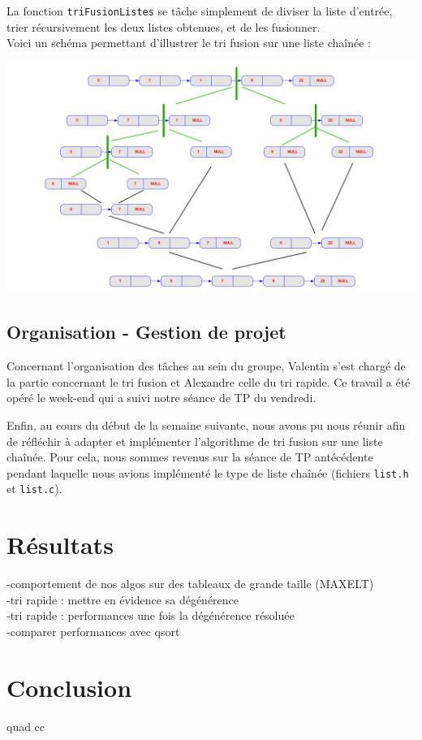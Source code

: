 \documentclass[11pt]{article}
\begin{document}
La fonction \texttt{triFusionListes} se tâche simplement de diviser la liste d'entrée, trier récursivement les deux listes obtenues, et de les fusionner. \\

Voici un schéma permettant d'illustrer le tri fusion sur une liste chaînée :

\begin{center}
\includegraphics[scale=0.25]{images/1.jpg}
\end{center}

\subsection{Organisation - Gestion de projet}

Concernant l'organisation des tâches au sein du groupe, Valentin s'est chargé de la partie concernant le tri fusion et Alexandre celle du tri rapide. Ce travail a été opéré le week-end qui a suivi notre séance de TP du vendredi.

Enfin, au cours du début de la semaine suivante, nous avons pu nous réunir afin de réfléchir à adapter et implémenter l'algorithme de tri fusion sur une liste chaînée. Pour cela, nous sommes revenus sur la séance de TP antécédente pendant laquelle nous avions implémenté le type de liste chaînée (fichiers \texttt{list.h} et \texttt{list.c}).


\section{Résultats}
-comportement de nos algos sur des tableaux de grande taille (MAX\textunderscore ELT) \\
-tri rapide : mettre en évidence sa dégénérence \\
-tri rapide : performances une fois la dégénérence résoluée \\
-comparer performances avec qsort 

\section{Conclusion}

\quad quad cc
\end{document}
